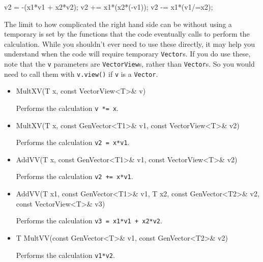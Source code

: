 \documentclass[twoside,letterpaper,11pt]{article}
\renewcommand{\tt}[1]{{\lstinline {#1}}}
\begin{document}
\begin{tmvcode}
v2 = -(x1*v1 + x2*v2);
v2 += x1*(x2*(-v1));
v2 -= x1*(v1/=x2);
\end{tmvcode}

The limit to how complicated the right hand side can be without using a 
temporary is set by the 
functions that the code eventually calls to perform the calculation.  
While you shouldn't ever
need to use these directly, it may help you understand when the code will require 
temporary \tt{Vector}s.  If you do use these, note that the \tt{v} parameters
are \tt{VectorView}s, rather than \tt{Vector}s.  So you would need to 
call them with \tt{v.view()} if \tt{v} is a \tt{Vector}.

\begin{itemize}

\item
\begin{tmvcode}
MultXV(T x, const VectorView<T>& v)
\end{tmvcode}
Performs the calculation \tt{v *= x}.

\item
\begin{tmvcode}
MultXV(T x, const GenVector<T1>& v1, const VectorView<T>& v2)
\end{tmvcode}
Performs the calculation \tt{v2 = x*v1}.

\item
\begin{tmvcode}
AddVV(T x, const GenVector<T1>& v1, const VectorView<T>& v2)
\end{tmvcode}
Performs the calculation \tt{v2 += x*v1}.

\item
\begin{tmvcode}
AddVV(T x1, const GenVector<T1>& v1, T x2, const GenVector<T2>& v2,
      const VectorView<T>& v3)
\end{tmvcode}
Performs the calculation \tt{v3 = x1*v1 + x2*v2}.

\item
\begin{tmvcode}
T MultVV(const GenVector<T>& v1, const GenVector<T2>& v2)
\end{tmvcode}
Performs the calculation \tt{v1*v2}.

\end{itemize}
\end{document}
